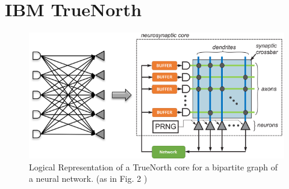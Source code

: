 \documentclass[11pt,twoside]{article}
\begin{document}

\section{IBM TrueNorth}
\label{sec:TrueNorth}

\begin{figure}
	\centering
	\includegraphics[width=0.5\linewidth]{Report-LateX-Template/fig/truenorthcore.png}
	\caption{Logical Representation of a TrueNorth core for a bipartite graph of a neural network. (as in Fig. 2 \cite{akopyan2015truenorth})}
	\label{fig:truenlogic}
\end{figure}
\end{document}
